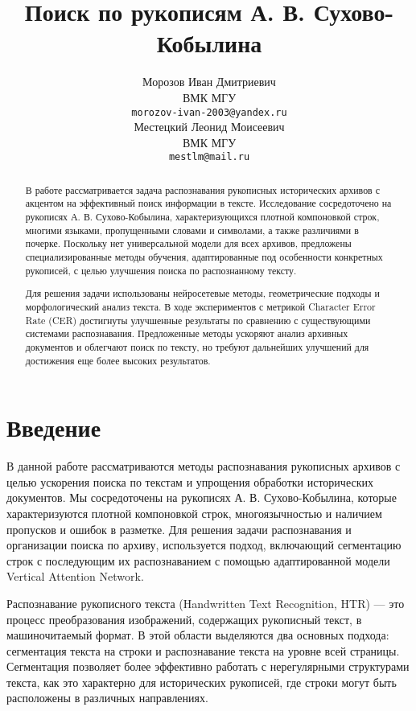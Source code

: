 \documentclass{article}
\title{Поиск по рукописям А. В. Сухово-Кобылина}
\author{ Морозов Иван Дмитриевич \\
	ВМК МГУ\\
	\texttt{morozov-ivan-2003@yandex.ru} \\
	\And
	Местецкий Леонид Моисеевич \\
	ВМК МГУ \\
	\texttt{mestlm@mail.ru} \\
}
\date{}
\begin{document}
\maketitle

\begin{abstract}
    В работе рассматривается задача распознавания рукописных исторических архивов с акцентом на эффективный поиск информации в тексте. Исследование сосредоточено на рукописях А. В. Сухово-Кобылина, характеризующихся плотной компоновкой строк, многими языками, пропущенными словами и символами, а также различиями в почерке. Поскольку нет универсальной модели для всех архивов, предложены специализированные методы обучения, адаптированные под особенности конкретных рукописей, с целью улучшения поиска по распознанному тексту.

    Для решения задачи использованы нейросетевые методы, геометрические подходы и морфологический анализ текста. В ходе экспериментов с метрикой Character Error Rate (CER) достигнуты улучшенные результаты по сравнению с существующими системами распознавания. Предложенные методы ускоряют анализ архивных документов и облегчают поиск по тексту, но требуют дальнейших улучшений для достижения еще более высоких результатов.
\end{abstract}



\section{Введение}
    В данной работе рассматриваются методы распознавания рукописных архивов с целью ускорения поиска по текстам и упрощения обработки исторических документов. Мы сосредоточены на рукописях А. В. Сухово-Кобылина, которые характеризуются плотной компоновкой строк, многоязычностью и наличием пропусков и ошибок в разметке. Для решения задачи распознавания и организации поиска по архиву, используется подход, включающий сегментацию строк с последующим их распознаванием с помощью адаптированной модели Vertical Attention Network.

    Распознавание рукописного текста (Handwritten Text Recognition, HTR) — это процесс преобразования изображений, содержащих рукописный текст, в машиночитаемый формат. В этой области выделяются два основных подхода: сегментация текста на строки и распознавание текста на уровне всей страницы. Сегментация позволяет более эффективно работать с нерегулярными структурами текста, как это характерно для исторических рукописей, где строки могут быть расположены в различных направлениях.
\end{document}
